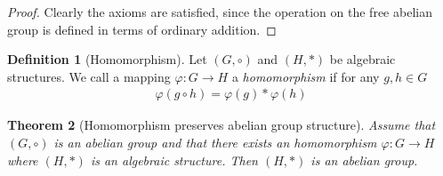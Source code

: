 \documentclass{article}
\theoremstyle{plain}
\newtheorem{theorem}{Theorem}
\theoremstyle{definition}
\newtheorem{definition}[theorem]{Definition}
\begin{document}
\begin{proof}
	Clearly the axioms  are satisfied, since the operation on the free abelian
	group is defined in terms of ordinary addition.
\end{proof}
\begin{definition}[Homomorphism]\label{Homomorphism}
Let $(G,\circ)$ and $(H,*)$ be algebraic structures. We call a mapping
$\varphi:G\rightarrow H$ a \textit{homomorphism} if for any $g,h \in G$
\begin{equation}
\begin{aligned}
	\varphi(g\circ h)= \varphi(g)*\varphi(h)
\end{aligned}
\end{equation}
\end{definition}
\begin{theorem}[Homomorphism preserves abelian group structure]
	Assume that $(G,\circ)$ is an abelian group and that there exists an
	homomorphism $\varphi: G \rightarrow H$ where $(H,*)$ is an algebraic
	structure. Then $(H,*)$ is an abelian group.
\end{theorem}
\end{document}
